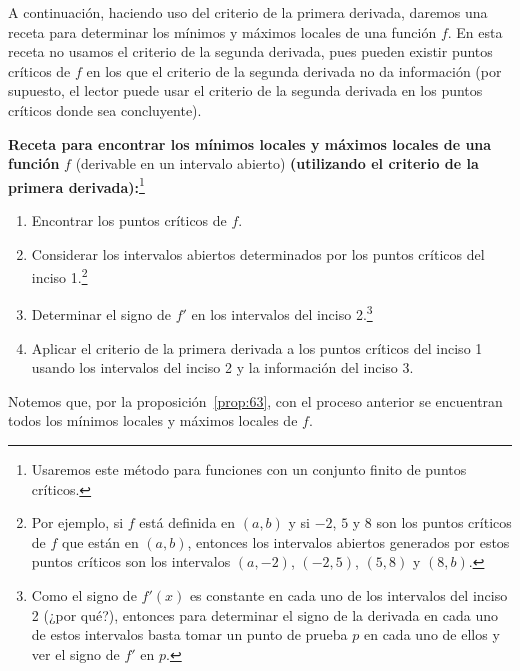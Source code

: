 \documentclass[12pt,a4paper]{book}
\newcommand{\receta}[1]{\par\addvspace{\medskipamount}#1\par\nobreak}
\begin{document}
    A continuación, haciendo uso del criterio de la primera derivada, daremos
    una receta para determinar los mínimos y máximos locales de una función
    $f$. En esta receta no usamos el criterio de la segunda derivada, pues pueden
    existir puntos críticos de $f$ en los que el criterio de la segunda derivada no
    da información (por supuesto, el lector puede usar el criterio de la segunda
    derivada en los puntos críticos donde sea concluyente).

    \receta{\textbf{Receta para encontrar los mínimos locales y máximos locales de una función} \normalfont$f$ (derivable en un intervalo abierto) \textbf{(utilizando el criterio de la primera derivada):}\footnote{Usaremos este método para funciones con un conjunto finito de puntos críticos.}}
    \begin{enumerate}[label=\arabic*.,nosep]
        \item Encontrar los puntos críticos de $f$.
        \item Considerar los intervalos abiertos determinados por los puntos críticos del
        inciso 1.\footnote{Por ejemplo, si $f$ está definida en $(a,b)$ y si $-2$, $5$ y $8$ son los puntos críticos de $f$ que
        están en $(a,b)$, entonces los intervalos abiertos generados por estos puntos críticos son los
        intervalos $(a,-2)$, $(-2,5)$, $(5,8)$ y $(8,b)$.}
        \item Determinar el signo de $f'$ en los intervalos del inciso 2.\footnote{Como el signo de $f'(x)$ es constante en cada uno de los intervalos del inciso 2 (¿por
        qué?), entonces para determinar el signo de la derivada en cada uno de estos intervalos
        basta tomar un punto de prueba $p$ en cada uno de ellos y ver el signo de $f'$ en $p$.}
        \item Aplicar el criterio de la primera derivada a los puntos críticos del inciso 1
        usando los intervalos del inciso 2 y la información del inciso 3.
    \end{enumerate}

    Notemos que, por la proposición~\ref{prop:63}, con el proceso anterior se encuentran
    todos los mínimos locales y máximos locales de $f$.
\end{document}
